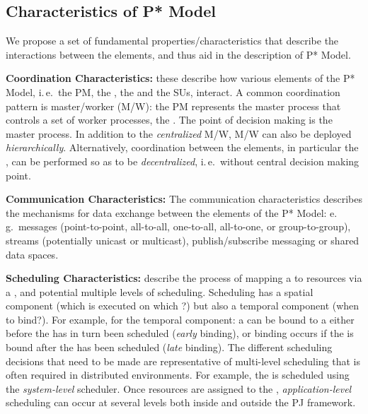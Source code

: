 \documentclass[conference]{IEEEtran}
\begin{document}
\subsection{Characteristics of P* Model}
\label{sec:p_star_elements}


 
We propose a set of fundamental properties/characteristics that
describe the interactions between the elements, and thus aid in the
description of P* Model.


\textbf{Coordination Characteristics:} these describe how
various elements of the P* Model, i.\,e.\ the PM, the \pilot, the \cus
and the SUs, interact. A common coordination pattern is master/worker
(M/W): the PM represents the master process that controls a set of
worker processes, the \pilots. The point of decision making is the
master process. In addition to the \emph{centralized} M/W, M/W can
also be deployed \emph{hierarchically}.  Alternatively, coordination
between the elements, in particular the \pilots, can be performed so as
to be \emph{decentralized}, i.\,e.\ without central decision making
point.

%

\textbf{Communication Characteristics:} The communication characteristics describes the
mechanisms for data exchange between the elements of the P* Model:
e.\,g.\ messages (point-to-point, all-to-all, one-to-all, all-to-one,
or group-to-group), streams (potentially unicast or multicast),
publish/subscribe messaging or shared data spaces.
		
\textbf{Scheduling Characteristics:} describe the process of mapping a \su to 
resources via a \pilot, and potential multiple levels of scheduling. Scheduling 
has a spatial component (which \su is executed on which \pilot?) but also a 
temporal component (when to bind?). For example, for the temporal component: a 
\su can be bound to a \pilot either before the \pilot has in turn been 
scheduled ({\it early} binding), or binding occurs if the \su is bound after 
the \pilot has been scheduled ({\it late} binding).
The different scheduling decisions that need to be made are representative of 
multi-level scheduling that is often required in distributed environments. For 
example, the \pilot is scheduled using the {\it system-level} scheduler. Once 
resources are assigned to the \pilot, {\it application-level} scheduling can 
occur at several levels both inside and outside the PJ framework.
\end{document}
